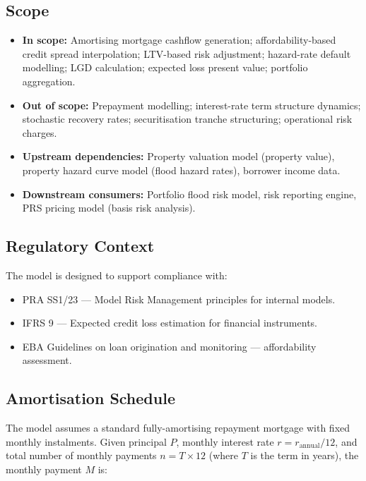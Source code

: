 \documentclass[11pt,a4paper]{article}
\begin{document}
\subsection{Scope}

\begin{itemize}[nosep]
    \item \textbf{In scope:} Amortising mortgage cashflow generation; affordability-based
          credit spread interpolation; LTV-based risk adjustment; hazard-rate default
          modelling; LGD calculation; expected loss present value; portfolio aggregation.
    \item \textbf{Out of scope:} Prepayment modelling; interest-rate term structure
          dynamics; stochastic recovery rates; securitisation tranche structuring;
          operational risk charges.
    \item \textbf{Upstream dependencies:} Property valuation model (property value),
          property hazard curve model (flood hazard rates), borrower income data.
    \item \textbf{Downstream consumers:} Portfolio flood risk model, risk reporting
          engine, PRS pricing model (basis risk analysis).
\end{itemize}

\subsection{Regulatory Context}

The model is designed to support compliance with:
\begin{itemize}[nosep]
    \item PRA SS1/23 --- Model Risk Management principles for internal models.
    \item IFRS 9 --- Expected credit loss estimation for financial instruments.
    \item EBA Guidelines on loan origination and monitoring --- affordability assessment.
\end{itemize}

\mkmframework

\subsection{Amortisation Schedule}

The model assumes a standard fully-amortising repayment mortgage with fixed monthly
instalments. Given principal $P$, monthly interest rate $r = r_{\text{annual}} / 12$,
and total number of monthly payments $n = T \times 12$ (where $T$ is the term in years),
the monthly payment $M$ is:
\end{document}
